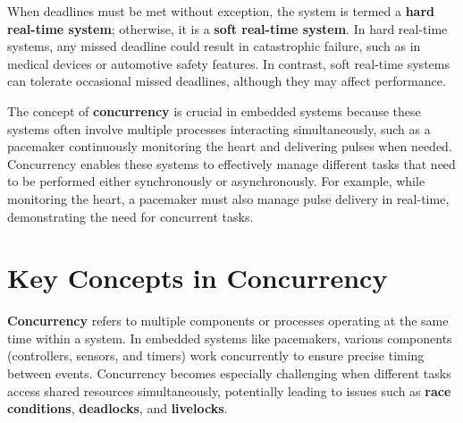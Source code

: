 \documentclass[
  14pt,
  a4paper,
  DIV=11,
  numbers=noendperiod,
  headinclude=true,
  footinclude=true]{scrreprt}
\begin{document}
When deadlines must be met without exception, the system is termed a
\textbf{hard real-time system}; otherwise, it is a \textbf{soft
real-time system}. In hard real-time systems, any missed deadline could
result in catastrophic failure, such as in medical devices or automotive
safety features. In contrast, soft real-time systems can tolerate
occasional missed deadlines, although they may affect performance.

The concept of \textbf{concurrency} is crucial in embedded systems
because these systems often involve multiple processes interacting
simultaneously, such as a pacemaker continuously monitoring the heart
and delivering pulses when needed. Concurrency enables these systems to
effectively manage different tasks that need to be performed either
synchronously or asynchronously. For example, while monitoring the
heart, a pacemaker must also manage pulse delivery in real-time,
demonstrating the need for concurrent tasks.

\section{Key Concepts in Concurrency}\label{key-concepts-in-concurrency}

\textbf{Concurrency} refers to multiple components or processes
operating at the same time within a system. In embedded systems like
pacemakers, various components (controllers, sensors, and timers) work
concurrently to ensure precise timing between events. Concurrency
becomes especially challenging when different tasks access shared
resources simultaneously, potentially leading to issues such as
\textbf{race conditions}, \textbf{deadlocks}, and \textbf{livelocks}.
\end{document}
